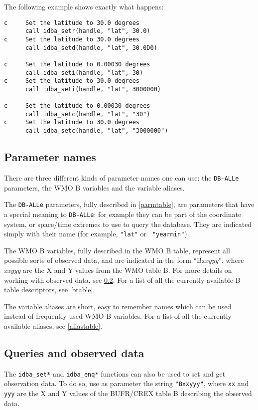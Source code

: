 \documentclass[final,12pt,a4paper,twoside]{book}
\newcommand{\dballe}{{\tt DB-ALLe}}
\begin{document}
The following example shows exactly what happens:

\begin{verbatim}
c     Set the latitude to 30.0 degrees
      call idba_setr(handle, "lat", 30.0)
c     Set the latitude to 30.0 degrees
      call idba_setd(handle, "lat", 30.0D0)

c     Set the latitude to 0.00030 degrees
      call idba_seti(handle, "lat", 30)
c     Set the latitude to 30.0 degrees
      call idba_seti(handle, "lat", 3000000)

c     Set the latitude to 0.00030 degrees
      call idba_setc(handle, "lat", "30")
c     Set the latitude to 30.0 degrees
      call idba_setc(handle, "lat", "3000000")
\end{verbatim}

\subsection {Parameter names}

There are three different kinds of parameter names one can use: the \dballe{}
parameters, the WMO B variables and the variable aliases.

The \dballe{} parameters, fully described in \ref{parmtable}, are parameters
that have a special meaning to \dballe{}: for example they can be part of the
coordinate system, or space/time extremes to use to query the database.  They
are indicated simply with their name (for example, {\tt "lat"} or {\tt
"yearmin"}).

The WMO B variables, fully described in the WMO B table, represent all possible
sorts of observed data, and are indicated in the form ``B{\itshape xxyyy}'',
where {\itshape xxyyy} are the X and Y values from the WMO table B.  For more
details on working with observed data, see \ref{obsdata}.  For a list of all
the currently available B table descriptors, see \ref{btable}.

The variable aliases are short, easy to remember names which can be used
instead of frequently used WMO B variables.  For a list of all the currently
available aliases, see \ref{aliastable}.

\subsection{Queries and observed data}
\label{obsdata}

The {\tt idba\_set*} and {\tt idba\_enq*} functions can also be used to set and get
observation data.  To do so, use as parameter the string {\tt "Bxxyyy"}, where
{\tt xx} and {\tt yyy} are the X and Y values of the BUFR/CREX table B describing
the observed data.
\end{document}
